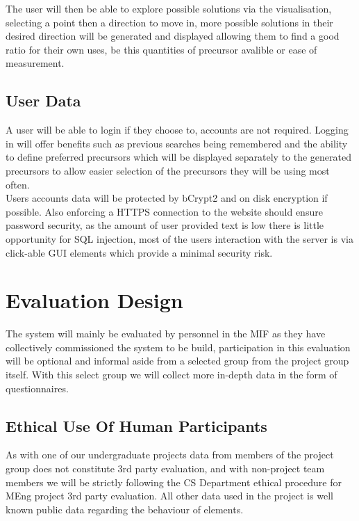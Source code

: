 \documentclass[a4paper, 12pt]{article}
\begin{document}
The user will then be able to explore possible solutions via the visualisation, selecting a point then a direction to move in, more possible solutions in their desired direction will be generated and displayed allowing them to find a good ratio for their own uses, be this quantities of precursor avalible or ease of measurement.

\subsection{User Data}
A user will be able to login if they choose to, accounts are not required. Logging in will offer benefits such as previous searches being remembered and the ability to define preferred precursors which will be displayed separately to the generated precursors to allow easier selection of the precursors they will be using most often.\\

Users accounts data will be protected by bCrypt2 and on disk encryption if possible. Also enforcing a HTTPS connection to the website should ensure password security, as the amount of user provided text is low there is little opportunity for SQL injection, most of the users interaction with the server is via click-able GUI elements which provide a minimal security risk.

\section{Evaluation Design}
The system will mainly be evaluated by personnel in the MIF as they have collectively commissioned the system to be build, participation in this evaluation will be optional and informal aside from a selected group from the project group itself. With this select group we will collect more in-depth data in the form of questionnaires. \\

\subsection{Ethical Use Of Human Participants}
As with one of our undergraduate projects data from members of the project group does not constitute 3rd party evaluation, and with non-project team members we will be strictly following the CS Department ethical procedure for MEng project 3rd party evaluation. All other data used in the project is well known public data regarding the behaviour of elements. \\
\end{document}
